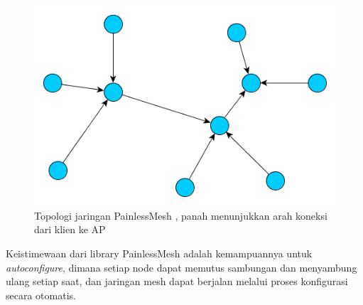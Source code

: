 \begin{figure}[h]
	\centering
	\includegraphics[scale=0.5]{./assets/painlessmesh}
	\caption{Topologi jaringan PainlessMesh \cite{HomeWikiPainlessMesh}, panah menunjukkan arah koneksi dari klien ke AP}
\end{figure}

Keistimewaan dari library PainlessMesh adalah kemampuannya untuk \textit{autoconfigure}, dimana setiap node dapat memutus sambungan dan menyambung ulang setiap saat, dan jaringan mesh dapat berjalan melalui proses konfigurasi secara otomatis.